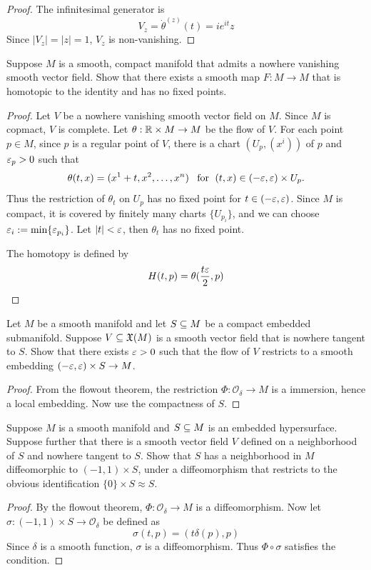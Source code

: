 \begin{proof}
The infinitesimal generator is
\[V_z=\dot{\theta}^{(z)}(t)=ie^{it}z\]
Since $|V_z|=|z|=1$, $V_z$ is non-vanishing.
\end{proof}
\begin{exercise}
Suppose $M$ is a smooth, compact manifold that admits a nowhere vanishing smooth vector field. Show that there exists a smooth map $F:M\to M$ that is homotopic to the identity and has no fixed points.
\end{exercise}
\begin{proof}
Let $V$ be a nowhere vanishing smooth vector field on $M$. Since $M$ is copmact, $V$ is complete. Let $\theta:\mathbb{R}\times M\to M$ be the flow of $V$. For each point $p\in M$, since $p$ is a regular point of $V$, there is a chart $(U_p,(x^i))$ of $p$ and $\varepsilon_p>0$ such that 
\[\theta(t,x)=(x^1+t,x^2,\dots,x^n)\hspace{8pt}\text{for}\hspace{6pt} (t,x)\in(-\varepsilon,\varepsilon)\times U_p.\] 
Thus the restriction of $\theta_t$ on $U_p$ has no fixed point for $t\in(-\varepsilon,\varepsilon)$. Since $M$ is compact, it is covered by finitely many charts $\{U_{p_i}\}$, and we can choose $\varepsilon_i:=\min\{\varepsilon_{p_i}\}$. Let $|t|<\varepsilon$, then $\theta_t$ has no fixed point.\par
The homotopy is defined by 
\[H(t,p)=\theta(\frac{t\varepsilon}{2},p)\]
\end{proof}
\begin{exercise}
Let $M$ be a smooth manifold and let $S\subseteq M$ be a compact embedded submanifold.
Suppose $V\subseteq\mathfrak{X}(M)$ is a smooth vector field that is nowhere tangent to $S$. Show that there exists $\varepsilon>0$ such that the flow of $V$ restricts to a smooth embedding $(-\varepsilon,\varepsilon)\times S\to M$.
\end{exercise}
\begin{proof}
From the flowout theorem, the restriction $\varPhi:\mathcal{O}_\delta\to　M$ is a immersion, hence a local embedding. Now use the compactness of $S$.
\end{proof}
\begin{exercise}
Suppose $M$ is a smooth manifold and $S\subseteq M$ is an embedded hypersurface. Suppose further that there is a smooth vector field $V$ defined on a neighborhood of $S$ and nowhere tangent to $S$. Show that $S$ has a neighborhood in $M$ diffeomorphic to $(-1,1)\times S$, under a diffeomorphism that restricts to the obvious identification $\{0\}\times S\approx S$.
\end{exercise}
\begin{proof}
By the flowout theorem, $\varPhi:\mathcal{O}_\delta\to M$ is a diffeomorphism. Now let $\sigma:(-1,1)\times S\to\mathcal{O}_\delta$ be defined as
\[\sigma(t,p)=(t\delta(p),p)\]
Since $\delta$ is a smooth function, $\sigma$ is a diffeomorphism. Thus $\varPhi\circ\sigma$ satisfies the condition.
\end{proof}
